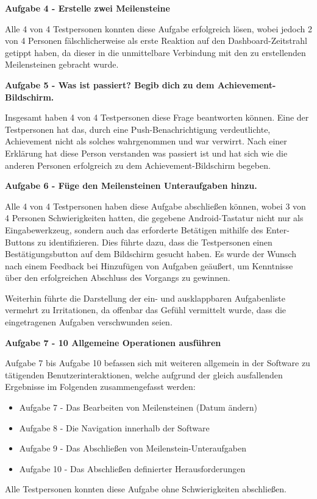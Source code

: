 \documentclass[bibliography=totoc,listof=totoc,BCOR=5mm,DIV=12,oneside]{scrbook}
\begin{document}
{\par \bigskip \textbf{Aufgabe 4 - Erstelle zwei Meilensteine}
\par Alle 4 von 4 Testpersonen konnten diese Aufgabe erfolgreich lösen, wobei jedoch 2 von 4 Personen fälschlicherweise als erste Reaktion auf den Dashboard-Zeitstrahl getippt haben, da dieser in die unmittelbare Verbindung mit den zu erstellenden Meilensteinen gebracht wurde.

\par \bigskip \textbf{Aufgabe 5 - Was ist passiert? Begib dich zu dem Achievement-Bildschirm.}
\par Insgesamt haben 4 von 4 Testpersonen diese Frage beantworten können. Eine der Testpersonen hat das, durch eine Push-Benachrichtigung verdeutlichte, Achievement nicht als solches wahrgenommen und war verwirrt. Nach einer Erklärung hat diese Person verstanden was passiert ist und hat sich wie die anderen Personen erfolgreich zu dem Achievement-Bildschirm begeben.

\newpage
\par \bigskip \textbf{Aufgabe 6 - Füge den Meilensteinen Unteraufgaben hinzu.}
\par Alle 4 von 4 Testpersonen haben diese Aufgabe abschließen können, wobei 3 von 4 Personen Schwierigkeiten hatten, die gegebene Android-Tastatur nicht nur als Eingabewerkzeug, sondern auch das erforderte Betätigen mithilfe des Enter-Buttons zu identifizieren. Dies führte dazu, dass die Testpersonen einen Bestätigungsbutton auf dem Bildschirm gesucht haben. Es wurde der Wunsch nach einem Feedback bei Hinzufügen von Aufgaben geäußert, um Kenntnisse über den erfolgreichen Abschluss des Vorgangs zu gewinnen.
\par Weiterhin führte die Darstellung der ein- und ausklappbaren Aufgabenliste vermehrt zu Irritationen, da offenbar das Gefühl vermittelt wurde, dass die eingetragenen Aufgaben verschwunden seien.

\par \bigskip \textbf{Aufgabe 7 - 10 Allgemeine Operationen ausführen}
\par Aufgabe 7 bis Aufgabe 10 befassen sich mit weiteren allgemein in der Software zu tätigenden Benutzerinteraktionen, welche aufgrund der gleich ausfallenden Ergebnisse im Folgenden zusammengefasst werden:
\begin{itemize}
\item Aufgabe 7  - Das Bearbeiten von Meilensteinen (Datum ändern)
\item Aufgabe 8  - Die Navigation innerhalb der Software
\item Aufgabe 9  - Das Abschließen von Meilenstein-Unteraufgaben
\item Aufgabe 10 - Das Abschließen definierter Herausforderungen
\end{itemize}
\par Alle Testpersonen konnten diese Aufgabe ohne Schwierigkeiten abschließen.

}
\end{document}
